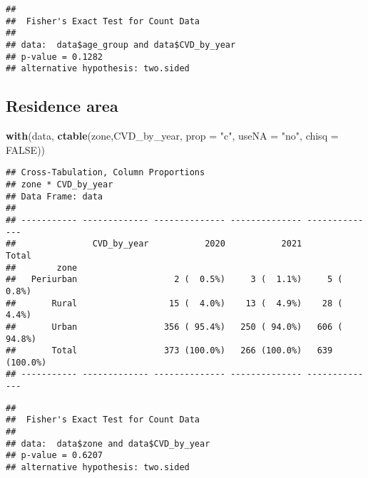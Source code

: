 \documentclass[
]{article}
\newenvironment{Shaded}{\begin{snugshade}}{\end{snugshade}}
\newcommand{\AttributeTok}[1]{\textcolor[rgb]{0.13,0.29,0.53}{#1}}
\newcommand{\ConstantTok}[1]{\textcolor[rgb]{0.56,0.35,0.01}{#1}}
\newcommand{\FunctionTok}[1]{\textcolor[rgb]{0.13,0.29,0.53}{\textbf{#1}}}
\newcommand{\NormalTok}[1]{#1}
\newcommand{\SpecialCharTok}[1]{\textcolor[rgb]{0.81,0.36,0.00}{\textbf{#1}}}
\newcommand{\StringTok}[1]{\textcolor[rgb]{0.31,0.60,0.02}{#1}}
\begin{document}
\begin{verbatim}
## 
##  Fisher's Exact Test for Count Data
## 
## data:  data$age_group and data$CVD_by_year
## p-value = 0.1282
## alternative hypothesis: two.sided
\end{verbatim}

\hypertarget{residence-area}{%
\subsection{Residence area}\label{residence-area}}

\begin{Shaded}
\begin{Highlighting}[]
\FunctionTok{with}\NormalTok{(data, }\FunctionTok{ctable}\NormalTok{(zone,CVD\_by\_year, }\AttributeTok{prop =} \StringTok{"c"}\NormalTok{, }\AttributeTok{useNA =} \StringTok{"no"}\NormalTok{, }\AttributeTok{chisq =} \ConstantTok{FALSE}\NormalTok{))}
\end{Highlighting}
\end{Shaded}

\begin{verbatim}
## Cross-Tabulation, Column Proportions  
## zone * CVD_by_year  
## Data Frame: data  
## 
## ----------- ------------- -------------- -------------- --------------
##               CVD_by_year           2020           2021          Total
##        zone                                                           
##   Periurban                   2 (  0.5%)     3 (  1.1%)     5 (  0.8%)
##       Rural                  15 (  4.0%)    13 (  4.9%)    28 (  4.4%)
##       Urban                 356 ( 95.4%)   250 ( 94.0%)   606 ( 94.8%)
##       Total                 373 (100.0%)   266 (100.0%)   639 (100.0%)
## ----------- ------------- -------------- -------------- --------------
\end{verbatim}

\begin{Shaded}
\end{Shaded}

\begin{verbatim}
## 
##  Fisher's Exact Test for Count Data
## 
## data:  data$zone and data$CVD_by_year
## p-value = 0.6207
## alternative hypothesis: two.sided
\end{verbatim}
\end{document}

